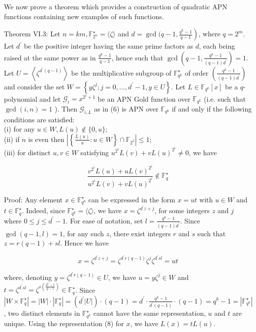 \documentclass[10pt]{article}
\begin{document}
We now prove a theorem which provides a construction of quadratic APN functions containing new examples of such functions.

Theorem VI.3: Let $n=k m, \mathbb{F}_{2^{n}}^{\star}=\langle\zeta\rangle$ and $d=\operatorname{gcd}(q- \left.1, \frac{q^{k}-1}{q-1}\right)$, where $q=2^{m}$. Let $d^{\prime}$ be the positive integer having the same prime factors as $d$, each being raised at the same power as in $\frac{q^{k}-1}{q-1}$, hence such that $\operatorname{gcd}\left(q-1, \frac{q^{k}-1}{(q-1) d^{\prime}}\right)=1$. Let $U=\left\langle\zeta^{d^{\prime}(q-1)}\right\rangle$ be the multiplicative subgroup of $\mathbb{F}_{q^{k}}^{\star}$ of order $\left(\frac{q^{k}-1}{(q-1) d^{\prime}}\right)$ and consider the set $W=\left\{y \zeta^{j} ; j=\right. \left.0, \ldots, d^{\prime}-1, y \in U\right\}$. Let $L \in \mathbb{F}_{q^{k}}[x]$ be a $q$-polynomial and let $\mathcal{G}_{i}=x^{2^{i}+1}$ be an APN Gold function over $\mathbb{F}_{q^{k}}$ (i.e. such that $\operatorname{gcd}(i, n)=1$ ). Then $\mathcal{G}_{i, L}$ as in (6) is APN over $\mathbb{F}_{q^{k}}$ if and only if the following conditions are satisfied:\\
(i) for any $u \in W, L(u) \notin\{0, u\}$;\\
(ii) if $n$ is even then $\left|\left\{\frac{L(u)}{u}: u \in W\right\} \cap \mathbb{F}_{2^{2}}\right| \leq 1$;\\
(iii) for distinct $u, v \in W$ satisfying $u^{2^{i}} L(v)+v L(u)^{2^{i}} \neq 0$, we have

$$
\frac{v^{2^{i}} L(u)+u L(v)^{2^{i}}}{u^{2^{i}} L(v)+v L(u)^{2^{i}}} \notin \mathbb{F}_{q}^{\star}
$$

Proof: Any element $x \in \mathbb{F}_{q^{k}}^{\star}$ can be expressed in the form $x=u t$ with $u \in W$ and $t \in \mathbb{F}_{q}^{\star}$. Indeed, since $\mathbb{F}_{q^{k}}^{\star}= \langle\zeta\rangle$, we have $x=\zeta^{d^{\prime} z+j}$, for some integers $z$ and $j$ where $0 \leq j \leq d^{\prime}-1$. For ease of notation, set $l=\frac{q^{k}-1}{(q-1) d^{\prime}}$. Since $\operatorname{gcd}(q-1, l)=1$, for any such $z$, there exist integers $r$ and $s$ such that $z=r(q-1)+s l$. Hence we have


\begin{equation*}
x=\zeta^{d^{\prime} z+j}=\zeta^{d^{\prime} r(q-1)} \zeta^{j} \zeta^{d^{\prime} s l}=u t \tag{8}
\end{equation*}


where, denoting $y=\zeta^{d^{\prime} r(q-1)} \in U$, we have $u=y \zeta^{j} \in W$ and $t=\zeta^{d^{\prime} s l}=\zeta^{s\left(\frac{q^{k}-1}{q-1}\right)} \in \mathbb{F}_{q}^{\star}$. Since $\left|W \times \mathbb{F}_{q}^{\star}\right|=|W| \cdot\left|\mathbb{F}_{q}^{\star}\right|= \left(d^{\prime}|U|\right) \cdot(q-1)=d^{\prime} \cdot \frac{q^{k}-1}{d^{\prime}(q-1)} \cdot(q-1)=q^{k}-1=\left|\mathbb{F}_{q^{k}}^{\star}\right|$, two distinct elements in $\mathbb{F}_{q^{k}}^{\star}$ cannot have the same representation, $u$ and $t$ are unique. Using the representation (8) for $x$, we have $L(x)=t L(u)$.
\end{document}
